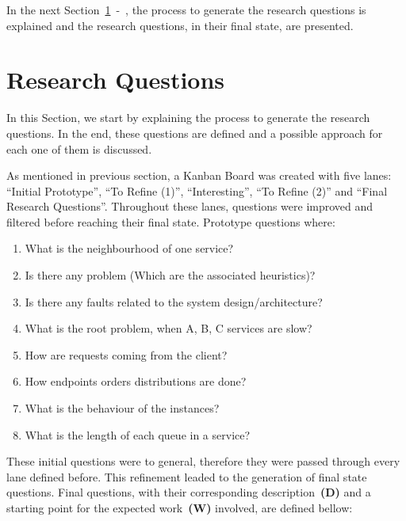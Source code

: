 In the next Section~\ref{sec:research_questions}~-~, the process to generate the research questions is explained and the research questions, in their final state, are presented.

\section{Research Questions}
\label{sec:research_questions}

In this Section, we start by explaining the process to generate the research questions. In the end, these questions are defined and a possible approach for each one of them is discussed.

As mentioned in previous section, a Kanban Board was created with five lanes: ``Initial Prototype'', ``To Refine (1)'', ``Interesting'', ``To Refine (2)'' and ``Final Research Questions''. Throughout these lanes, questions were improved and filtered before reaching their final state. Prototype questions where:

\newpage

\begin{enumerate}
    \item What is the neighbourhood of one service?
    \item Is there any problem (Which are the associated heuristics)?
    \item Is there any faults related to the system design/architecture?
    \item What is the root problem, when A, B, C services are slow?
    \item How are requests coming from the client?
    \item How endpoints orders distributions are done?
    \item What is the behaviour of the instances?
    \item What is the length of each queue in a service?
\end{enumerate}

These initial questions were to general, therefore they were passed through every lane defined before. This refinement leaded to the generation of final state questions. Final questions, with their corresponding description~\textbf{(D)} and a starting point for the expected work~\textbf{(W)} involved, are defined bellow:

